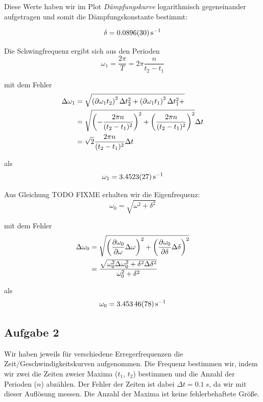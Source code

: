 \documentclass[a4paper,german,12pt,smallheadings]{scrartcl}
\begin{document}
\vspace{1cm}

Diese Werte haben wir im Plot \textit{Dämpfungskurve} logarithmisch
gegeneinander aufgetragen und somit die Dämpfungskonstante bestimmt:

\begin{equation}
  \delta = \SI{0.0896+-0.0030}{s^{-1}}
\end{equation}

Die Schwingfrequenz ergibt sich aus den Perioden
\begin{equation}
  \omega_1 = \frac{2 \pi}{T} = 2 \pi \frac{n}{t_2 - t_1}
\end{equation}

mit dem Fehler
\begin{align}
  \Delta \omega_1 &= \sqrt{
    \del{\partial{\omega_1}{t_2}}^2 \Delta t_2^2 +
    \del{\partial{\omega_1}{t_1}}^2 \Delta t_1^2 +
  } \\
  &= \sqrt{
    \del{-\frac{2 \pi n}{(t_2 - t_1)^2}}^2 +
    \del{\frac{2 \pi n}{(t_2 - t_1)^2}}^2
  } \Delta t \\
  &= \sqrt{2} \frac{2 \pi n}{(t_2 - t_1)^2} \Delta t
\end{align}

als
\begin{equation}
  \omega_1 = \SI{3.4523+-0.0027}{s^{-1}}
\end{equation}

Aus Gleichung TODO FIXME erhalten wir die Eigenfrequenz: %
\begin{equation}
  \omega_0 = \sqrt{\omega^2  + \delta^2}
\end{equation}

mit dem Fehler
\begin{align}
  \Delta \omega_0 &= \sqrt{
  \del{\frac{\partial \omega_0}{\partial \omega} \Delta \omega}^2+
  \del{\frac{\partial \omega_0}{\partial \delta} \Delta \delta}^2
} \\
&= \frac{\sqrt{\omega_0^2 \Delta \omega_0^2 + \delta^2 \Delta \delta^2}}{\omega_0^2 + \delta^2}
\end{align}

als
\begin{equation}
  \omega_0 = \SI{3.45346+-0.00078}{s^{-1}}
\end{equation}


\subsection{Aufgabe 2}
Wir haben jeweils für verschiedene Erregerfrequenzen die
Zeit/Geschwindigkeitskurven aufgenommen. Die Frequenz bestimmen wir, indem wir
zwei die Zeiten zweier Maxima ($t_1$, $t_2$) bestimmen und die Anzahl der
Perioden ($n$) abzählen. Der Fehler der Zeiten ist dabei $\Delta t =
\SI{0.1}{s}$, da wir mit dieser Auflösung messen. Die Anzahl der Maxima ist
keine fehlerbehaftete Größe.
\end{document}
